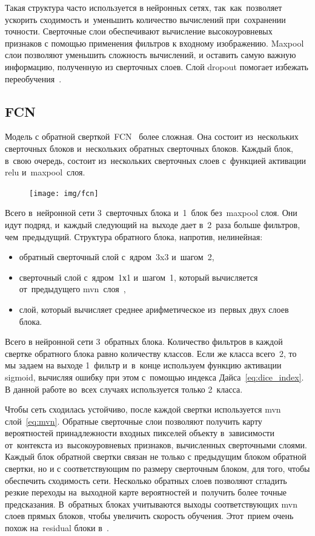 Такая структура часто используется в нейронных сетях, так~как~позволяет ускорить сходимость и~уменьшить количество вычислений при~сохранении точности. Сверточные слои обеспечивают вычисление высокоуровневых признаков с помощью применения фильтров к входному изображению. Maxpool слои позволяют уменьшить сложность вычислений, и оставить самую важную информацию, полученную из сверточных слоев. Слой dropout помогает избежать переобучения~\cite{dropout}. 

\subsection{FCN}

Модель с обратной сверткой~FCN~\cite{fcn} более сложная. Она состоит из~нескольких сверточных блоков и~нескольких обратных сверточных блоков. Каждый блок, в~свою очередь, состоит из~нескольких сверточных слоев с~функцией активации relu и~maxpool~слоя. 

\begin{figure}[ht]
  \texttt{[image: img/fcn]}
\end{figure}

Всего в~нейронной сети 3~сверточных блока и~1~блок без~maxpool слоя. Они идут подряд, и~каждый следующий на~выходе дает в~2~раза больше фильтров, чем~предыдущий. 
\newpage
Структура обратного блока, напротив, нелинейная:

\begin{itemize}
  \item обратный сверточный слой с~ядром~3x3 и~шагом~2,
  \item сверточный слой с~ядром~1х1 и~шагом~1, который вычисляется от~предыдущего mvn~слоя~\cite{batch_norm},
  \item слой, который вычисляет среднее арифметическое из~первых двух слоев блока.
\end{itemize}

Всего в нейронной сети 3~обратных блока. 
Количество фильтров в каждой свертке обратного блока 
равно количеству классов. Если же класса всего~2, 
то мы задаем на выходе 1~фильтр и~в~конце используем 
функцию активации sigmoid, вычисляя ошибку при этом 
с~помощью индекса Дайса~\eqref{eq:dice_index}. 
В данной работе во~всех случаях используется только 2~класса.

Чтобы сеть сходилась устойчиво, после каждой свертки 
используется mvn слой~\eqref{eq:mvn}. Обратные сверточные слои 
позволяют получить карту вероятностей принадлежности 
входных пикселей объекту в~зависимости от~контекста 
из~высокоуровневых признаков, вычисленных сверточными слоями. 
Каждый блок обратной свертки связан не только с предыдущим блоком 
обратной свертки, но и с соответствующим по размеру сверточным блоком, 
для того, чтобы обеспечить сходимость сети. Несколько обратных слоев 
позволяют сгладить резкие переходы на~выходной карте вероятностей 
и~получить более точные предсказания. В~обратных блоках учитываются 
выходы соответствующих mvn слоев прямых блоков, чтобы увеличить 
скорость обучения. Этот~прием очень похож на~residual блоки в~\cite{resnet}.

